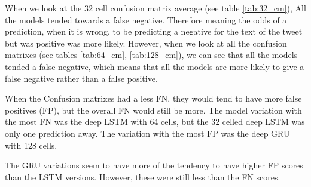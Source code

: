 \documentclass[a4paper,10pt]{article}
\newcommand\MyBox[2]{
	\fbox{\lower0.6cm
		\vbox to 0.6cm{\vfil
			\hbox to 0.9cm{\hfil\parbox{1.0cm}{#1\\#2}\hfil}
			\vfil}%
	}%
}
\begin{document}
	When we look at the 32 cell confusion matrix average (see table \ref{tab:32_cm}), All the models tended towards a false negative. Therefore meaning the odds of a prediction, when it is wrong, to be predicting a negative for the text of the tweet but was positive was more likely. However, when we look at all the confusion matrixes (see tables \ref{tab:64_cm}, \ref{tab:128_cm}), we can see that all the models tended a false negative, which means that all the models are more likely to give a false negative rather than a false positive. 
	

	


	

	When the Confusion matrixes had a less FN, they would tend to have more false positives (FP), but the overall FN would still be more. The model variation with the most FN was the deep LSTM with 64 cells, but the 32 celled deep LSTM was only one prediction away. The variation with the most FP was the deep GRU with 128 cells.
	
	The GRU variations seem to have more of the tendency to have higher FP scores than the LSTM versions. However, these were still less than the FN scores.    

\end{document}
